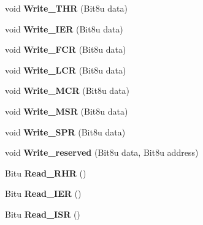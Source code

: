 \begin{DoxyCompactItemize}
\item 
\hypertarget{classCSerial_a8e7597eb951ddc04d0778765ae9fd05f}{void {\bfseries Write\-\_\-\-T\-H\-R} (Bit8u data)}\label{classCSerial_a8e7597eb951ddc04d0778765ae9fd05f}

\item 
\hypertarget{classCSerial_ade69b9fe0ccc79ab266b11ab32872dd8}{void {\bfseries Write\-\_\-\-I\-E\-R} (Bit8u data)}\label{classCSerial_ade69b9fe0ccc79ab266b11ab32872dd8}

\item 
\hypertarget{classCSerial_a9eb41bc2d20464ce68e22579b47f291d}{void {\bfseries Write\-\_\-\-F\-C\-R} (Bit8u data)}\label{classCSerial_a9eb41bc2d20464ce68e22579b47f291d}

\item 
\hypertarget{classCSerial_a28616544f272ab054298621561447924}{void {\bfseries Write\-\_\-\-L\-C\-R} (Bit8u data)}\label{classCSerial_a28616544f272ab054298621561447924}

\item 
\hypertarget{classCSerial_a4f95a3cccb9403edb4947e6de6101346}{void {\bfseries Write\-\_\-\-M\-C\-R} (Bit8u data)}\label{classCSerial_a4f95a3cccb9403edb4947e6de6101346}

\item 
\hypertarget{classCSerial_a332d706f5979eb07dfb8e4ada29e7dfa}{void {\bfseries Write\-\_\-\-M\-S\-R} (Bit8u data)}\label{classCSerial_a332d706f5979eb07dfb8e4ada29e7dfa}

\item 
\hypertarget{classCSerial_ae27c570b7bcd4c5ac6e0f4c4a5ff2045}{void {\bfseries Write\-\_\-\-S\-P\-R} (Bit8u data)}\label{classCSerial_ae27c570b7bcd4c5ac6e0f4c4a5ff2045}

\item 
\hypertarget{classCSerial_a28e4f958e7b7edc46a295d2fe5c7dbc8}{void {\bfseries Write\-\_\-reserved} (Bit8u data, Bit8u address)}\label{classCSerial_a28e4f958e7b7edc46a295d2fe5c7dbc8}

\item 
\hypertarget{classCSerial_ade498e8c549ed48e8001bcfce6771fe0}{Bitu {\bfseries Read\-\_\-\-R\-H\-R} ()}\label{classCSerial_ade498e8c549ed48e8001bcfce6771fe0}

\item 
\hypertarget{classCSerial_a35867fc7d933b6dfe45c566d6fea5619}{Bitu {\bfseries Read\-\_\-\-I\-E\-R} ()}\label{classCSerial_a35867fc7d933b6dfe45c566d6fea5619}

\item 
\hypertarget{classCSerial_a9ca17032de727b3288f09169bcdeee2f}{Bitu {\bfseries Read\-\_\-\-I\-S\-R} ()}\label{classCSerial_a9ca17032de727b3288f09169bcdeee2f}


\end{DoxyCompactItemize}
